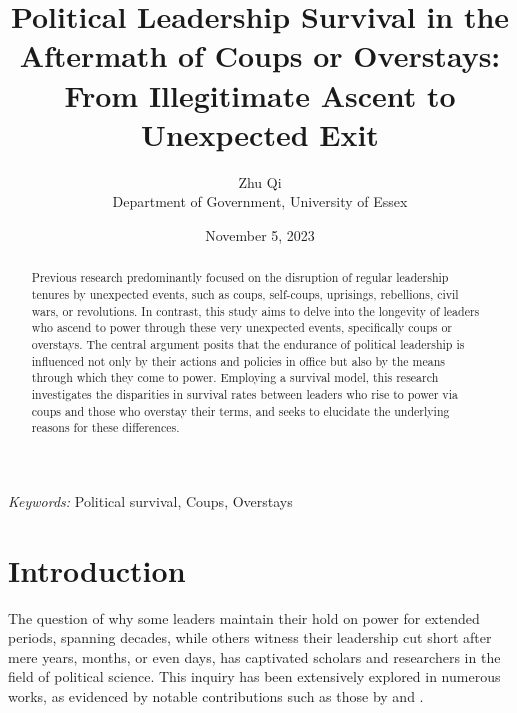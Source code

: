 \documentclass[
  12pt,
  a4paper,
  12pt]{article}
\begin{document}
\def\spacingset#1{\renewcommand{\baselinestretch}%
{#1}\small\normalsize} \spacingset{1}



\date{November 5, 2023}
\title{\bf Political Leadership Survival in the Aftermath of Coups or
Overstays: From Illegitimate Ascent to Unexpected Exit}
\author{
Zhu Qi\\
Department of Government, University of Essex\\
}
\maketitle

\bigskip
\bigskip
\begin{abstract}
Previous research predominantly focused on the disruption of regular
leadership tenures by unexpected events, such as coups, self-coups,
uprisings, rebellions, civil wars, or revolutions. In contrast, this
study aims to delve into the longevity of leaders who ascend to power
through these very unexpected events, specifically coups or overstays.
The central argument posits that the endurance of political leadership
is influenced not only by their actions and policies in office but also
by the means through which they come to power. Employing a survival
model, this research investigates the disparities in survival rates
between leaders who rise to power via coups and those who overstay their
terms, and seeks to elucidate the underlying reasons for these
differences.
\end{abstract}

\noindent%
{\it Keywords:} Political survival, Coups, Overstays
\vfill

\newpage
\spacingset{1.9} %
\ifdefined\Shaded\renewenvironment{Shaded}{\begin{tcolorbox}[enhanced, interior hidden, boxrule=0pt, frame hidden, borderline west={3pt}{0pt}{shadecolor}, breakable, sharp corners]}{\end{tcolorbox}}\fi

\hypertarget{introduction}{%
\section{Introduction}\label{introduction}}

The question of why some leaders maintain their hold on power for
extended periods, spanning decades, while others witness their
leadership cut short after mere years, months, or even days, has
captivated scholars and researchers in the field of political science.
This inquiry has been extensively explored in numerous works, as
evidenced by notable contributions such as those by
\citet{clinton1975politics} and \citet{buenodemesquita2003}.
\end{document}
